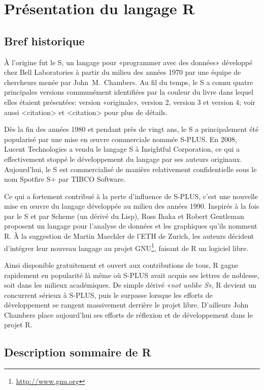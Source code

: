 \documentclass[11pt,article,french]{memoir}
\begin{document}
\chapter{Présentation du langage R}
\label{chap:presentation}

\section{Bref historique}
\label{sec:presentation:historique}

À l'origine fut le S, un langage pour «programmer avec des données»
développé chez Bell Laboratories à partir du milieu des années 1970
par une équipe de chercheurs menée par John~M.\ Chambers. Au fil du
temps, le S a connu quatre principales versions communément
identifiées par la couleur du livre dans lequel elles étaient
présentées: %
version «originale», %
version 2, %
version 3 et %
version 4; %
voir aussi <citation> et <citation> pour plus de détails.

Dès la fin des années 1980 et pendant près de vingt ans, le S a
principalement été popularisé par une mise en {\oe}uvre commerciale
nommée S-PLUS. En 2008, Lucent Technologies a vendu le langage S à
Insightful Corporation, ce qui a effectivement stoppé le développement
du langage par ses auteurs originaux. Aujourd'hui, le S est
commercialisé de manière relativement confidentielle sous le nom
Spotfire S$+$ par TIBCO Software.

Ce qui a fortement contribué à la perte d'influence de S-PLUS, c'est
une nouvelle mise en {\oe}uvre du langage développée au milieu des
années 1990. Inspirés à la fois par le S et par Scheme (un dérivé du
Lisp), Ross Ihaka et Robert Gentleman proposent un langage pour
l'analyse de données et les graphiques qu'ils nomment R. À la
suggestion de Martin Maechler de l'ETH de Zurich, les auteurs décident
d'intégrer leur nouveau langage au projet GNU\footnote{%
  \url{http://www.gnu.org}}, %
faisant de R un logiciel libre.

Ainsi disponible gratuitement et ouvert aux contributions de tous,
R gagne rapidement en popularité là même où S-PLUS avait acquis ses
lettres de noblesse, soit dans les milieux académiques. De simple
dérivé «\emph{not unlike S}», R devient un concurrent sérieux à
S-PLUS, puis le surpasse lorsque les efforts de développement se
rangent massivement derrière le projet libre. D'ailleurs John Chambers
place aujourd'hui ses efforts de réflexion et de développement dans le
projet R.


\section{Description sommaire de R}
\label{sec:presentation:description}
\end{document}

